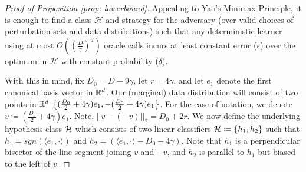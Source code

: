\begin{proof}[Proof of Proposition \ref{prop: lowerbound}]

Appealing to Yao's Minimax Principle, it is enough to find a class $\mathcal{H}$ and strategy for the adversary (over valid choices of perturbation sets and data distributions) such that any deterministic learner using at most $O((\frac{D}{\gamma})^d)$ oracle calls incurs at least constant error ($\epsilon$) over the optimum in $\mathcal{H}$ with constant probability ($\delta$). 

With this in mind, fix $D_0 =D-9\gamma$, let $r = 4\gamma$, and let $e_1$ denote the first canonical basis vector in $\mathbb{R}^d$. Our (marginal) data distribution will consist of two points in $\mathbb{R}^d$ $\left\{(\frac{D_0}{2}+4\gamma)e_1,-(\frac{D_0}{2}+4\gamma)e_1\right\}$. For the ease of notation, we denote $v \coloneqq (\frac{D_0}{2}+4\gamma)e_1$. Note, $||v- (-v)||_2 = D_0 + 2r$. We now define the underlying hypothesis class $\mathcal H$ which consists of two linear classifiers $\mathcal H \coloneqq \left\{h_{1},h_{2}\right\}$ such that $h_1 = sgn(\langle e_1, \cdot \rangle)$ and $h_2 = (\langle e_1, \cdot \rangle - D_0 - 4\gamma)$. Note that $h_1$ is a perpendicular bisector of the line segment joining $v$ and $-v$, and $h_2$ is parallel to $h_1$ but biased to the left of $v$.


\end{proof}
